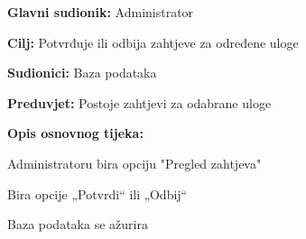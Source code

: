 					\noindent {}
					\begin{packed_item}
	
						\item \textbf{Glavni sudionik: }  Administrator
						\item  \textbf{Cilj:} Potvrđuje ili odbija zahtjeve za određene uloge
						\item  \textbf{Sudionici:} Baza podataka
						\item  \textbf{Preduvjet:} Postoje zahtjevi za odabrane uloge
						\item  \textbf{Opis osnovnog tijeka:} 
						
						
						\item[] \begin{packed_enum}
	
							\item Administratoru bira opciju "Pregled zahtjeva"
							\item Bira opcije „Potvrdi“ ili „Odbij“
							\item Baza podataka se ažurira
							\item 
						\end{packed_enum}
					\end{packed_item}
					\noindent {}
